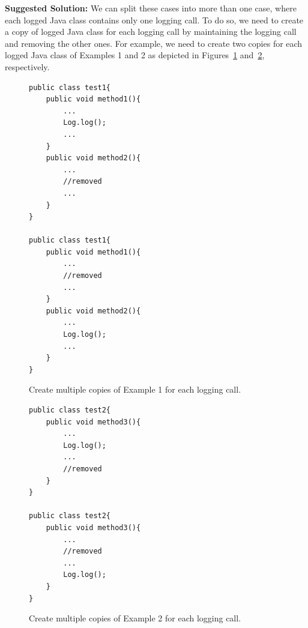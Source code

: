 \textbf{Suggested Solution:} We can split these cases into more than one case, where each logged Java class contains only one logging call. To do so, we need to create a copy of logged Java class for each logging call by maintaining the logging call and removing the other ones. For example, we need to create two copies for each logged Java class of Examples 1 and 2 as depicted in Figures~\ref{multiple1-one} and~\ref{multiple2-one}, respectively.


\begin{figure}[H]
\def\baselinestretch{1}
\begin{lstlisting}
public class test1{
	public void method1(){
		...
		Log.log();
		...
	}
	public void method2(){
		...
		//removed
		...
	}
}

public class test1{
	public void method1(){
		...
		//removed
		...
	}
	public void method2(){
		...
		Log.log();
		...
	}
}

\end{lstlisting}
\caption{Create multiple copies of Example 1 for each logging call.\label{multiple1-one}}
\end{figure}



\begin{figure}[H]
\def\baselinestretch{1}
\begin{lstlisting}
public class test2{
	public void method3(){
		...
		Log.log();
		...
		//removed
	}
}

public class test2{
	public void method3(){
		...
		//removed
		...
		Log.log();
	}
}

\end{lstlisting}
\caption{Create multiple copies of Example 2 for each logging call.\label{multiple2-one}}
\end{figure}



